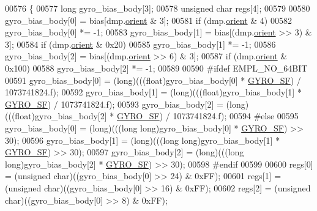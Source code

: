 \begin{DoxyCode}
00576 \{
00577     \textcolor{keywordtype}{long} gyro\_bias\_body[3];
00578     \textcolor{keywordtype}{unsigned} \textcolor{keywordtype}{char} regs[4];
00579 
00580     gyro\_bias\_body[0] = bias[dmp.\hyperlink{structdmp__s_ac949b11ebfe17c3a2ac42785a1437c25}{orient} & 3];
00581     \textcolor{keywordflow}{if} (dmp.\hyperlink{structdmp__s_ac949b11ebfe17c3a2ac42785a1437c25}{orient} & 4)
00582         gyro\_bias\_body[0] *= -1;
00583     gyro\_bias\_body[1] = bias[(dmp.\hyperlink{structdmp__s_ac949b11ebfe17c3a2ac42785a1437c25}{orient} >> 3) & 3];
00584     \textcolor{keywordflow}{if} (dmp.\hyperlink{structdmp__s_ac949b11ebfe17c3a2ac42785a1437c25}{orient} & 0x20)
00585         gyro\_bias\_body[1] *= -1;
00586     gyro\_bias\_body[2] = bias[(dmp.\hyperlink{structdmp__s_ac949b11ebfe17c3a2ac42785a1437c25}{orient} >> 6) & 3];
00587     \textcolor{keywordflow}{if} (dmp.\hyperlink{structdmp__s_ac949b11ebfe17c3a2ac42785a1437c25}{orient} & 0x100)
00588         gyro\_bias\_body[2] *= -1;
00589 
00590 \textcolor{preprocessor}{#ifdef EMPL\_NO\_64BIT}
00591     gyro\_bias\_body[0] = (long)(((\textcolor{keywordtype}{float})gyro\_bias\_body[0] * \hyperlink{group___d_r_i_v_e_r_s_gac0325c658f2911bdfc3b44fca31c684f}{GYRO\_SF}) / 1073741824.f);
00592     gyro\_bias\_body[1] = (long)(((\textcolor{keywordtype}{float})gyro\_bias\_body[1] * \hyperlink{group___d_r_i_v_e_r_s_gac0325c658f2911bdfc3b44fca31c684f}{GYRO\_SF}) / 1073741824.f);
00593     gyro\_bias\_body[2] = (long)(((\textcolor{keywordtype}{float})gyro\_bias\_body[2] * \hyperlink{group___d_r_i_v_e_r_s_gac0325c658f2911bdfc3b44fca31c684f}{GYRO\_SF}) / 1073741824.f);
00594 \textcolor{preprocessor}{#else}
00595     gyro\_bias\_body[0] = (long)(((\textcolor{keywordtype}{long} \textcolor{keywordtype}{long})gyro\_bias\_body[0] * \hyperlink{group___d_r_i_v_e_r_s_gac0325c658f2911bdfc3b44fca31c684f}{GYRO\_SF}) >> 30);
00596     gyro\_bias\_body[1] = (long)(((\textcolor{keywordtype}{long} \textcolor{keywordtype}{long})gyro\_bias\_body[1] * \hyperlink{group___d_r_i_v_e_r_s_gac0325c658f2911bdfc3b44fca31c684f}{GYRO\_SF}) >> 30);
00597     gyro\_bias\_body[2] = (long)(((\textcolor{keywordtype}{long} \textcolor{keywordtype}{long})gyro\_bias\_body[2] * \hyperlink{group___d_r_i_v_e_r_s_gac0325c658f2911bdfc3b44fca31c684f}{GYRO\_SF}) >> 30);
00598 \textcolor{preprocessor}{#endif}
00599 
00600     regs[0] = (\textcolor{keywordtype}{unsigned} char)((gyro\_bias\_body[0] >> 24) & 0xFF);
00601     regs[1] = (\textcolor{keywordtype}{unsigned} char)((gyro\_bias\_body[0] >> 16) & 0xFF);
00602     regs[2] = (\textcolor{keywordtype}{unsigned} char)((gyro\_bias\_body[0] >> 8) & 0xFF);

\end{DoxyCode}

